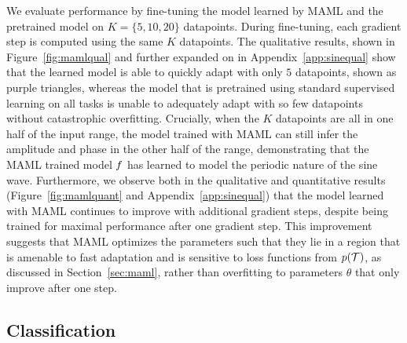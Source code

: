 \documentclass{article}
\begin{document}
We evaluate performance by fine-tuning the model learned by MAML and the pretrained model on $K=\{5,10,20\}$ datapoints. During fine-tuning, each gradient step is computed using the same $K$ datapoints. The qualitative results, shown in Figure~\ref{fig:mamlqual} and further expanded on in Appendix~\ref{app:sinequal} show that the learned model is able to quickly adapt with only $5$ datapoints, shown as purple triangles, whereas the model that is pretrained using standard supervised learning on all tasks is unable to adequately adapt with so few datapoints without catastrophic overfitting. Crucially, when the $K$ datapoints are all in one half of the input range, the model trained with MAML can still infer the amplitude and phase in the other half of the range, demonstrating that the MAML trained model $f$ has learned to model the periodic nature of the sine wave. Furthermore, we observe both in the qualitative and quantitative results (Figure~\ref{fig:mamlquant} and Appendix~\ref{app:sinequal}) that the model learned with MAML continues to improve with additional gradient steps, despite being trained for maximal performance after one gradient step. This improvement suggests that MAML optimizes the parameters such that they lie in a region that is amenable to fast adaptation and is sensitive to loss functions from $p(\mathcal{T})$, as discussed in Section~\ref{sec:maml}, rather than overfitting to parameters $\theta$ that only improve after one step.


\subsection{Classification}
\label{sec:image_results}
\end{document}
